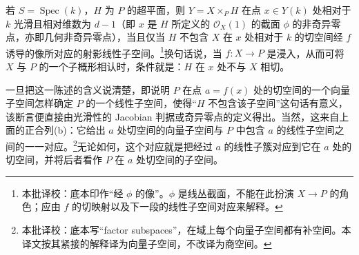 \documentclass{ctexbook}
\newcommand{\corr}[1]{\footnote{本批译校：#1}}
\newcommand{\cO}{\mathcal O}
\newcommand{\Spec}{\operatorname{Spec}}
\begin{document}
若 $S=\Spec(k)$，$H$ 为 $P$ 的超平面，则 $Y=X\times_P H$ 在点 $x\in Y(k)$ 处相对于 $k$ 光滑且相对维数为 $d-1$（即 $x$ 是 $H$ 所定义的 $\cO_X(1)$ 的截面 $\phi$ 的非奇异零点，亦即几何非奇异零点），当且仅当 $H$ 不包含 $X$ 在 $x$ 处相对于 $k$ 的切空间经 $f$ 诱导的像所对应的射影线性子空间。\corr{底本印作“经 $\phi$ 的像”。$\phi$ 是线丛截面，不能在此扮演 $X\to P$ 的角色；应由 $f$ 的切映射以及下一段的线性子空间对应来解释。}换句话说，当 $f:X\to P$ 是浸入，从而可将 $X$ 与 $P$ 的一个子概形相认时，条件就是：$H$ 在 $x$ 处不与 $X$ 相切。

一旦把这一陈述的含义说清楚，即说明 $P$ 在点 $a=f(x)$ 处的切空间的一个向量子空间怎样确定 $P$ 的一个线性子空间，使得“$H$ 不包含该子空间”这句话有意义，该断言便直接由光滑性的 Jacobian 判据或奇异零点的定义得出。当然，这来自上面的正合列(b)：它给出 $a$ 处切空间的向量子空间与 $P$ 中包含 $a$ 的线性子空间之间的一一对应。\corr{底本写“factor subspaces”，在域上每个向量子空间都有补空间。本译文按其紧接的解释译为向量子空间，不改译为商空间。}无论如何，这个对应就是把经过 $a$ 的线性子簇对应到它在 $a$ 处的切空间，并将后者看作 $P$ 在 $a$ 处切空间的子空间。
\end{document}
